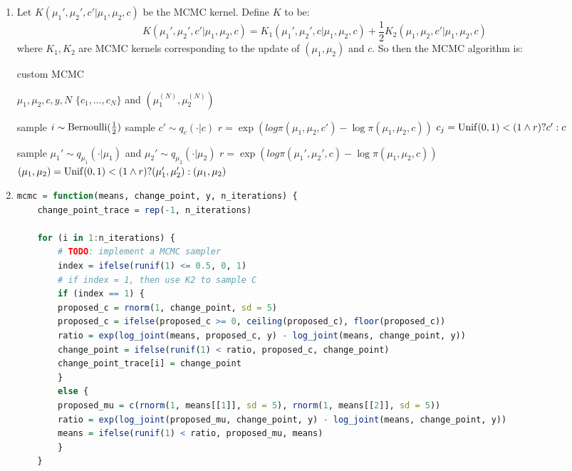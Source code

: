 \documentclass{article}
\begin{document}



\begin{enumerate}
\item 
Let $K(\mu_1', \mu_2', c' | \mu_1, \mu_2, c)$ be the MCMC kernel. Define $K$ to be:
\[K(\mu_1', \mu_2', c' | \mu_1, \mu_2, c) = K_1(\mu_1', \mu_2', c | \mu_1, \mu_2, c) + \frac12 K_2(\mu_1, \mu_2, c' | \mu_1, \mu_2, c)\]where $K_1, K_2$ are MCMC kernels corresponding to the update of $(\mu_1, \mu_2)$ and $c$. So then the MCMC algorithm is:
\begin{algorithm}
    \caption{custom MCMC}
    \label{algo:mixture}
    \begin{algorithmic}[1]
        \Require $\mu_1, \mu_2, c, y, N$
        \Ensure $\{c_1, \ldots, c_N\}$ and $(\mu_1^{(N)}, \mu_2^{(N)})$

        \State sample $i \sim \operatorname{Bernoulli}(\frac12)$
        \State sample $c' \sim q_c( \cdot | c)$
        \State $r = \exp(log\pi(\mu_1, \mu_2, c') - \log\pi(\mu_1, \mu_2, c))$
        \State $c_j = \operatorname{Unif}(0,1) < (1 \wedge r) ? c' : c$

        \Else 
        \State sample $\mu_1' \sim q_{\mu_1}(\cdot | \mu_1)$ and $\mu_2' \sim q_{\mu_2}(\cdot | \mu_2)$
        \State $r = \exp(log\pi(\mu_1', \mu_2', c) - \log\pi(\mu_1, \mu_2, c))$
        \State $(\mu_1, \mu_2) = \operatorname{Unif}(0,1) < (1 \wedge r) ? (\mu_1', \mu_2') : (\mu_1, \mu_2)$

        \EndIf
        \EndFor
    \end{algorithmic}

\end{algorithm}



\item 
\begin{lstlisting}[language=R]
mcmc = function(means, change_point, y, n_iterations) {
    change_point_trace = rep(-1, n_iterations)
    
    for (i in 1:n_iterations) {
        # TODO: implement a MCMC sampler
        index = ifelse(runif(1) <= 0.5, 0, 1)
        # if index = 1, then use K2 to sample C
        if (index == 1) {
        proposed_c = rnorm(1, change_point, sd = 5)
        proposed_c = ifelse(proposed_c >= 0, ceiling(proposed_c), floor(proposed_c))
        ratio = exp(log_joint(means, proposed_c, y) - log_joint(means, change_point, y))
        change_point = ifelse(runif(1) < ratio, proposed_c, change_point)
        change_point_trace[i] = change_point
        }
        else {
        proposed_mu = c(rnorm(1, means[[1]], sd = 5), rnorm(1, means[[2]], sd = 5))
        ratio = exp(log_joint(proposed_mu, change_point, y) - log_joint(means, change_point, y))
        means = ifelse(runif(1) < ratio, proposed_mu, means)
        }
    }
    

\end{lstlisting}
\end{enumerate}
\end{document}
